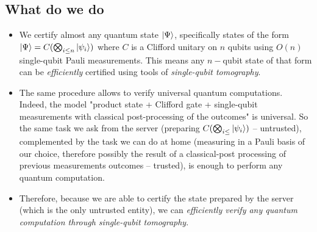 \documentclass[a4paper,unpublished,onecolumn,11pt]{quantumarticle}
\begin{document}
\subsection{What do we do}
\begin{itemize}
    \item We certify almost any quantum state $\ket\Psi$, specifically states of the form $\ket\Psi = C(\bigotimes_{i\leq n} \ket{\psi_i})$ where $C$ is a Clifford unitary on $n$ qubits using $O(n)$ single-qubit Pauli measurements.
    This means any $n-$qubit state of that form can be \textit{efficiently} certified using tools of \textit{single-qubit tomography}.
    \item The same procedure allows to verify universal quantum computations. Indeed, the model "product state + Clifford gate + single-qubit measurements with classical post-processing of the outcomes" is universal. So the same task we ask from the server (preparing $C(\bigotimes_{i\leq}\ket{\psi_i})$ -- untrusted), complemented by the task we can do at home (measuring in a Pauli basis of our choice, therefore possibly the result of a classical-post processing of previous measurements outcomes -- trusted), is enough to perform any quantum computation.
    
    \item Therefore, because we are able to certify the state prepared by the server (which is the only untrusted entity), we can \textit{efficiently verify any quantum computation through single-qubit tomography}.


\end{itemize}
\end{document}

